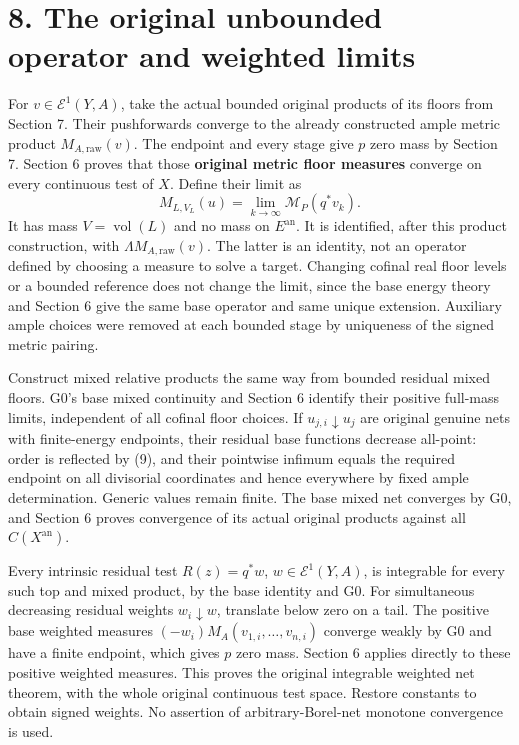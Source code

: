 \documentclass[
  10pt,
]{article}
\begin{document}
\section{8. The original unbounded operator and weighted
limits}\label{the-original-unbounded-operator-and-weighted-limits}

For \(v\in\mathcal E^1(Y,A)\), take the actual bounded original products
of its floors from Section 7. Their pushforwards converge to the already
constructed ample metric product \(M_{A,\mathrm{raw}}(v)\). The endpoint
and every stage give \(p\) zero mass by Section 7. Section 6 proves that
those \textbf{original metric floor measures} converge on every
continuous test of \(X\). Define their limit as
\[M_{L,V_L}(u)=\lim_{k\to\infty}\mathcal M_P(q^*v_k).
                                                                    \tag{13}\]
It has mass \(V=\operatorname{vol}(L)\) and no mass on
\(E^{\mathrm{an}}\). It is identified, after this product construction,
with \(\Lambda M_{A,\mathrm{raw}}(v)\). The latter is an identity, not
an operator defined by choosing a measure to solve a target. Changing
cofinal real floor levels or a bounded reference does not change the
limit, since the base energy theory and Section 6 give the same base
operator and same unique extension. Auxiliary ample choices were removed
at each bounded stage by uniqueness of the signed metric pairing.

Construct mixed relative products the same way from bounded residual
mixed floors. G0's base mixed continuity and Section 6 identify their
positive full-mass limits, independent of all cofinal floor choices. If
\(u_{j,i}\downarrow u_j\) are original genuine nets with finite-energy
endpoints, their residual base functions decrease all-point: order is
reflected by (9), and their pointwise infimum equals the required
endpoint on all divisorial coordinates and hence everywhere by fixed
ample determination. Generic values remain finite. The base mixed net
converges by G0, and Section 6 proves convergence of its actual original
products against all \(C(X^{\mathrm{an}})\).

Every intrinsic residual test \(R(z)=q^*w\), \(w\in\mathcal E^1(Y,A)\),
is integrable for every such top and mixed product, by the base identity
and G0. For simultaneous decreasing residual weights
\(w_i\downarrow w\), translate below zero on a tail. The positive base
weighted measures \((-w_i)M_A(v_{1,i},\ldots,v_{n,i})\) converge weakly
by G0 and have a finite endpoint, which gives \(p\) zero mass. Section 6
applies directly to these positive weighted measures. This proves the
original integrable weighted net theorem, with the whole original
continuous test space. Restore constants to obtain signed weights. No
assertion of arbitrary-Borel-net monotone convergence is used.
\end{document}
